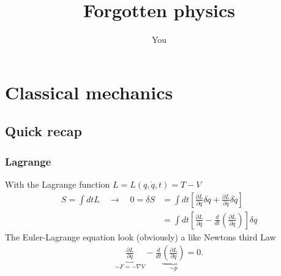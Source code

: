 \documentclass{article}
\title{Forgotten physics}
\author{You}
\begin{document}
\maketitle

\section{Classical mechanics}
\subsection{Quick recap}
\subsubsection{Lagrange}
With the Lagrange function $L=L(q,\dot q,t)=T-V$ 
\begin{align}
    S=\int dt L\quad\rightarrow\quad
    0=\delta S 
    &= \int dt\left[\frac{\partial L}{\partial q}\delta q+\frac{\partial L}{\partial \dot q}\delta\dot q\right]\\
    &= \int dt\left[\frac{\partial L}{\partial q}-\frac{d}{dt}\left(\frac{\partial L}{\partial \dot q}\right)\right]\delta q
\end{align}
The Euler-Lagrange equation look (obviously) a like Newtons third Law
\begin{align}
    \underbrace{\frac{\partial L}{\partial q}}_{\sim F=-\nabla V}-\frac{d}{dt}\underbrace{\left(\frac{\partial L}{\partial \dot q}\right)}_{\sim p} = 0.
\end{align}
\end{document}

